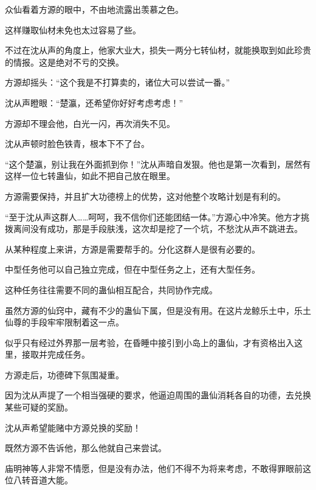 \begin{this_body}
众仙看着方源的眼中，不由地流露出羡慕之色。

这样赚取仙材未免也太过容易了些。

不过在沈从声的角度上，他家大业大，损失一两分七转仙材，就能换取到如此珍贵的情报。这是绝对不亏的交换。

方源却摇头：“这个我是不打算卖的，诸位大可以尝试一番。”

沈从声瞪眼：“楚瀛，还希望你好好考虑考虑！”

方源却不理会他，白光一闪，再次消失不见。

沈从声顿时脸色铁青，根本下不了台。

“这个楚瀛，别让我在外面抓到你！”沈从声暗自发狠。他也是第一次看到，居然有这样一位七转蛊仙，如此不把自己放在眼里。

方源需要保持，并且扩大功德榜上的优势，这对他整个攻略计划是有利的。

“至于沈从声这群人……呵呵，我不信你们还能团结一体。”方源心中冷笑。他方才挑拨离间没有成功，那是手段肤浅，这次却是挖了一个坑，不愁沈从声不跳进去。

从某种程度上来讲，方源是需要帮手的。分化这群人是很有必要的。

中型任务他可以自己独立完成，但在中型任务之上，还有大型任务。

这种任务往往需要不同的蛊仙相互配合，共同协作完成。

虽然方源的仙窍中，藏有不少的蛊仙下属，但是没有用。在这片龙鲸乐土中，乐土仙尊的手段牢牢限制着这一点。

似乎只有经过外界那一层考验，在昏睡中接引到小岛上的蛊仙，才有资格出入这里，接取并完成任务。

方源走后，功德碑下氛围凝重。

因为沈从声提了一个相当强硬的要求，他逼迫周围的蛊仙消耗各自的功德，去兑换某些可疑的奖励。

沈从声希望能赌中方源兑换的奖励！

既然方源不告诉他，那么他就自己来尝试。

庙明神等人非常不情愿，但是没有办法，他们不得不为将来考虑，不敢得罪眼前这位八转音道大能。

\end{this_body}

